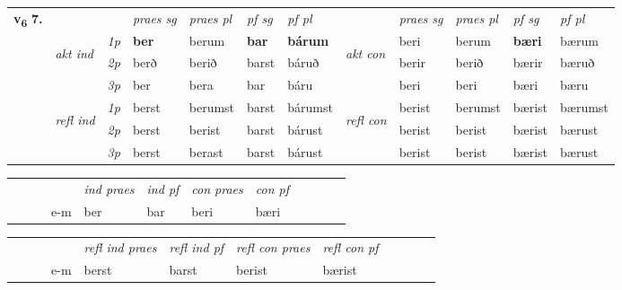 \begin{tabular}{llllllllllll} \toprule
\multirow{4}{*}{{{\textbf{v{\textsubscript{6}}} \Large{\textbf{7.}}}}}  & &   &  \textit{praes sg}  & \textit{praes pl}  &\textit{ pf sg} & \textit{pf pl} &  &  \textit{praes sg}  & \textit{praes pl}  & \textit{pf sg} & \textit{pf pl } \\*
	\cmidrule{4-7} \cmidrule{9-12}
 & \multirow{3}{*}{\begin{turn}{90}\textit{akt ind}\end{turn}} & {\textit{1p}} & \textbf{ber} & berum    & \textbf{bar} & \textbf{bárum} & \multirow{3}{*}{\begin{turn}{90}\textit{akt con}\end{turn}} &beri & berum & \textbf{bæri} & bærum\\*
& &  {\textit{2p}} &  berð  & berið   & barst & báruð & & berir & berið & bærir & bæruð \\*
& &  {\textit{3p}} & ber & bera   & bar & báru & & beri & beri& bæri & bæru  \\*
\cmidrule{4-7} \cmidrule{9-12}
 &\multirow{3}{*}{\begin{turn}{90}\textit{refl ind}\end{turn}} & {\textit{1p}} & berst & berumst    & barst & bárumst & \multirow{3}{*}{\begin{turn}{90}\textit{refl con}\end{turn}}  &berist & berumst & bærist & bærumst\\*
 &&  {\textit{2p}} &  berst  & berist   & barst & bárust & &berist & berist & bærist & bærust \\*
& &  {\textit{3p}} & berst & berast   & barst & bárust & & berist & berist& bærist & bærust  \\*
\cmidrule{4-7} \cmidrule{9-12}
\end{tabular}


\begin{tabular}{llllllllllll}
 & &  & &  \textit{ind praes} & \textit{ind pf} & \textit{con praes} & \textit{con pf} \\*
&  & & e-m & ber & bar & beri & bæri \\*
\cmidrule{5-9}
\end{tabular}


\begin{tabular}{llllllllllll}
 & &  & &  \textit{refl ind praes} & \textit{refl ind pf} & \textit{refl con praes} & \textit{refl con pf} \\*
&  & & e-m & berst & barst & berist & bærist \\*
\cmidrule{5-9}
\end{tabular}


